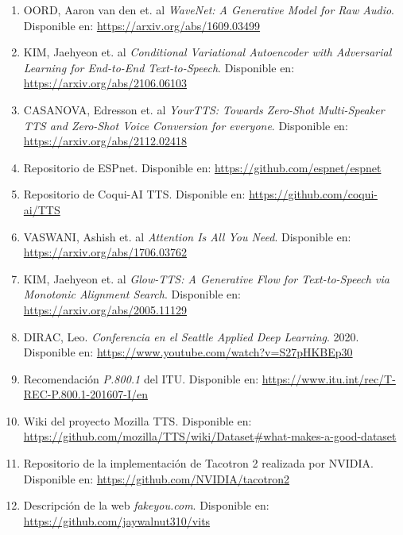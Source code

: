 \begin{enumerate}
\label{EA_7}
\item{OORD, Aaron van den et. al \emph{WaveNet: A Generative Model for Raw Audio}. Disponible en: \url{https://arxiv.org/abs/1609.03499}}

\label{EA_8}
\item{KIM, Jaehyeon et. al \emph{Conditional Variational Autoencoder with Adversarial Learning for End-to-End Text-to-Speech}. Disponible en: \url{https://arxiv.org/abs/2106.06103}}

\label{EA_9}
\item{CASANOVA, Edresson et. al \emph{YourTTS: Towards Zero-Shot Multi-Speaker TTS and Zero-Shot Voice Conversion for everyone}. Disponible en: \url{https://arxiv.org/abs/2112.02418}}

\label{EA_2}
\item{Repositorio de ESPnet. Disponible en: \url{https://github.com/espnet/espnet}}

\label{EA_3}
\item{Repositorio de Coqui-AI TTS. Disponible en: \url{https://github.com/coqui-ai/TTS}}


\label{RES_1}
\item{VASWANI, Ashish et. al \emph{Attention Is All You Need}. Disponible en: \url{https://arxiv.org/abs/1706.03762}}


\label{RES_1_1}
\item{KIM, Jaehyeon et. al \emph{Glow-TTS: A Generative Flow for Text-to-Speech via Monotonic Alignment Search}. Disponible en: \url{https://arxiv.org/abs/2005.11129}}


\label{RES_2}
\item{DIRAC, Leo. \emph{Conferencia en el Seattle Applied Deep Learning}. 2020. Disponible en: \url{https://www.youtube.com/watch?v=S27pHKBEp30}}

\label{RES_3}
\item{Recomendación \emph{P.800.1} del ITU. Disponible en: 
\url{https://www.itu.int/rec/T-REC-P.800.1-201607-I/en}}

\label{RES_4}
\item{Wiki del proyecto Mozilla TTS. Disponible en: \url{https://github.com/mozilla/TTS/wiki/Dataset\#what-makes-a-good-dataset}}

\label{RES_5}
\item{Repositorio de la implementación de Tacotron 2 realizada por NVIDIA. Disponible en: \url{https://github.com/NVIDIA/tacotron2}}

\label{RES_6}
\item{Descripción de la web \emph{fakeyou.com}. Disponible en: \url{https://github.com/jaywalnut310/vits}}


\end{enumerate}
